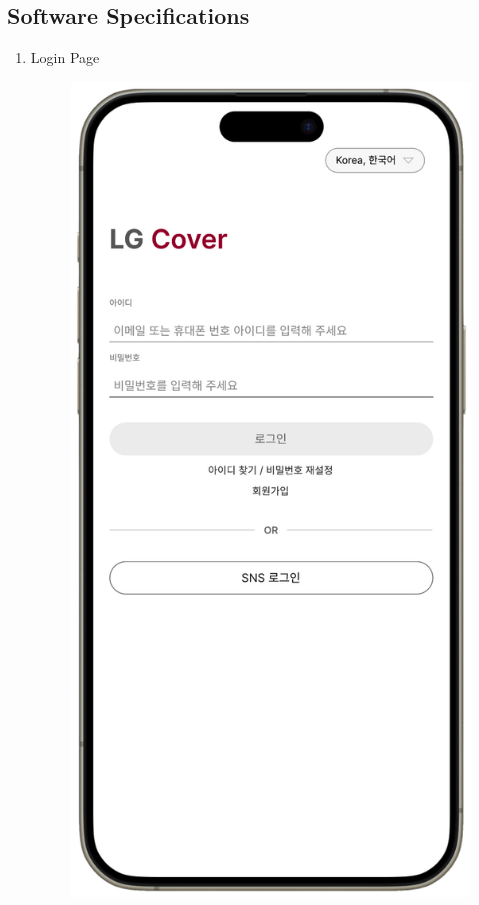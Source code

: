 \documentclass[conference]{IEEEtran}
\begin{document}
\subsection{\large{Software Specifications}}
\begin{enumerate}[label=\arabic*.]
\item Login Page\\
\begin{figure}[H]\centering \includegraphics[scale=0.35]{images/sw-spec-1.png}\end{figure}

\end{enumerate}
\end{document}
